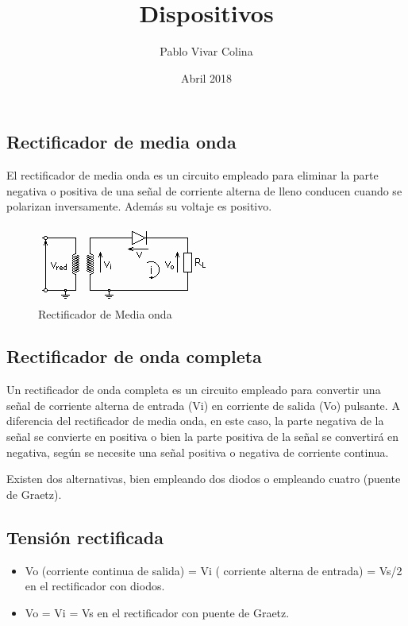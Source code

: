 \documentclass{article}
\title{Dispositivos}
\author{Pablo Vivar Colina}
\date{Abril 2018}
\begin{document}
\maketitle


\subsection{Rectificador de media onda}

El rectificador de media onda es un circuito empleado para eliminar la parte negativa o positiva de una señal de corriente alterna de lleno conducen cuando se polarizan inversamente. Además su voltaje es positivo.\citep{circuitoMediaOnda}

\begin{figure}[h!]
    \centering
    \includegraphics{Circuito_rectificador_media_onda.png}
    \caption{Rectificador de Media onda}
    \label{fig:rectificadorMedia}
\end{figure}

\subsection{Rectificador de onda completa}

Un rectificador de onda completa es un circuito empleado para convertir una señal de corriente alterna de entrada (Vi) en corriente de salida (Vo) pulsante. A diferencia del rectificador de media onda, en este caso, la parte negativa de la señal se convierte en positiva o bien la parte positiva de la señal se convertirá en negativa, según se necesite una señal positiva o negativa de corriente continua.

Existen dos alternativas, bien empleando dos diodos o empleando cuatro (puente de Graetz).\citep{circuitoOnda}

\subsection{Tensión rectificada}

\begin{itemize}
    \item  Vo (corriente continua de salida) = Vi ( corriente alterna de entrada) = Vs/2 en el rectificador con diodos.
    \item  Vo = Vi = Vs en el rectificador con puente de Graetz.
\end{itemize}
\end{document}
